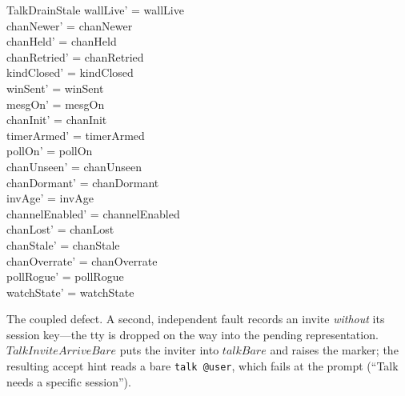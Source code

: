 \documentclass[a4paper,10pt,fleqn]{article}
\begin{document}
\begin{schema}{TalkDrainStale}
  wallLive' = wallLive \\
  chanNewer' = chanNewer \\
  chanHeld' = chanHeld \\
  chanRetried' = chanRetried \\
  kindClosed' = kindClosed \\
  winSent' = winSent \\
  mesgOn' = mesgOn \\
  chanInit' = chanInit \\
  timerArmed' = timerArmed \\
  pollOn' = pollOn \\
  chanUnseen' = chanUnseen \\
  chanDormant' = chanDormant \\
  invAge' = invAge \\
  channelEnabled' = channelEnabled \\
  chanLost' = chanLost \\
  chanStale' = chanStale \\
  chanOverrate' = chanOverrate \\
  pollRogue' = pollRogue \\
  watchState' = watchState
\end{schema}

The coupled defect.  A second, independent fault records an invite
\emph{without} its session key---the tty is dropped on the way into the
pending representation.  $TalkInviteArriveBare$ puts the inviter into
$talkBare$ and raises the marker; the resulting accept hint reads a bare
\texttt{talk @user}, which fails at the prompt (``Talk needs a specific
session'').
\end{document}
